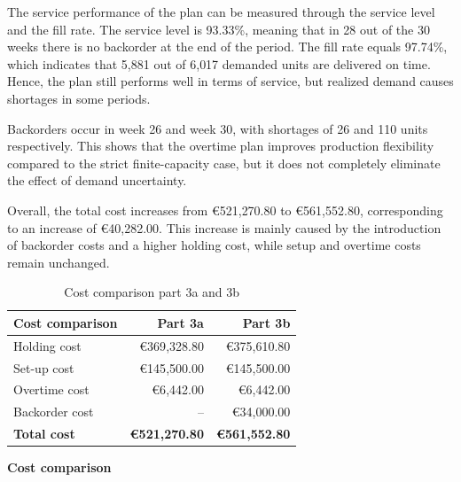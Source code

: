 \documentclass[a4paper,faculty=eb,language=en,doctype=article,sftitles=false]{ugent-doc}
\begin{document}
The service performance of the plan can be measured through the service level and the fill rate. The service level is 93.33\%, meaning that in 28 out of the 30 weeks there is no backorder at the end of the period. The fill rate equals 97.74\%, which indicates that 5{,}881 out of 6{,}017 demanded units are delivered on time. Hence, the plan still performs well in terms of service, but realized demand causes shortages in some periods.

Backorders occur in week 26 and week 30, with shortages of 26 and 110 units respectively. This shows that the overtime plan improves production flexibility compared to the strict finite-capacity case, but it does not completely eliminate the effect of demand uncertainty.

Overall, the total cost increases from €521{,}270.80 to €561{,}552.80, corresponding to an increase of €40{,}282.00. This increase is mainly caused by the introduction of backorder costs and a higher holding cost, while setup and overtime costs remain unchanged.

\begin{table}[H]
\centering
\begin{minipage}[c]{0.44\textwidth}
\centering
\begin{tabular}{lrr}
\toprule
\textbf{Cost comparison} & \textbf{Part 3a} & \textbf{Part 3b} \\
\midrule
Holding cost   & €369{,}328.80 & €375{,}610.80 \\
Set-up cost    & €145{,}500.00 & €145{,}500.00 \\
Overtime cost  & €6{,}442.00   & €6{,}442.00 \\
Backorder cost & --            & €34{,}000.00 \\
\midrule
\textbf{Total cost} & \textbf{€521{,}270.80} & \textbf{€561{,}552.80} \\
\bottomrule
\end{tabular}
\end{minipage}
\hspace{0.06\textwidth}
\begin{minipage}[c]{0.44\textwidth}
\centering
\textbf{Cost comparison}

\vspace{0.3em}
\end{minipage}
\caption{Cost comparison part 3a and 3b}
\end{table}
\end{document}
